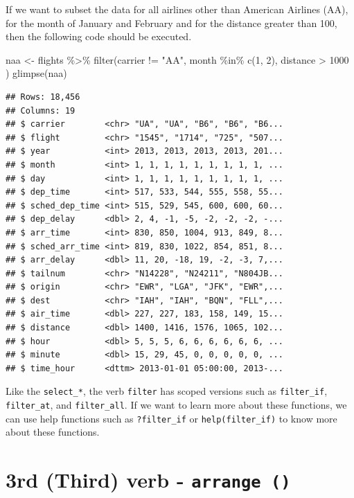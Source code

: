 \documentclass[
]{book}
\newenvironment{Shaded}{\begin{snugshade}}{\end{snugshade}}
\newcommand{\DecValTok}[1]{\textcolor[rgb]{0.00,0.00,0.81}{#1}}
\newcommand{\FunctionTok}[1]{\textcolor[rgb]{0.00,0.00,0.00}{#1}}
\newcommand{\NormalTok}[1]{#1}
\newcommand{\OtherTok}[1]{\textcolor[rgb]{0.56,0.35,0.01}{#1}}
\newcommand{\SpecialCharTok}[1]{\textcolor[rgb]{0.00,0.00,0.00}{#1}}
\newcommand{\StringTok}[1]{\textcolor[rgb]{0.31,0.60,0.02}{#1}}
\begin{document}
If we want to subset the data for all airlines other than American Airlines (AA), for the month of January and February and for the distance greater than 100, then the following code should be executed.

\begin{Shaded}
\begin{Highlighting}[]
\NormalTok{naa }\OtherTok{\textless{}{-}}\NormalTok{ flights }\SpecialCharTok{\%\textgreater{}\%} 
  \FunctionTok{filter}\NormalTok{(carrier }\SpecialCharTok{!=} \StringTok{"AA"}\NormalTok{, month }\SpecialCharTok{\%in\%} \FunctionTok{c}\NormalTok{(}\DecValTok{1}\NormalTok{, }\DecValTok{2}\NormalTok{), distance }\SpecialCharTok{\textgreater{}} \DecValTok{1000}
\NormalTok{  )}
\FunctionTok{glimpse}\NormalTok{(naa)}
\end{Highlighting}
\end{Shaded}

\begin{verbatim}
## Rows: 18,456
## Columns: 19
## $ carrier        <chr> "UA", "UA", "B6", "B6", "B6...
## $ flight         <chr> "1545", "1714", "725", "507...
## $ year           <int> 2013, 2013, 2013, 2013, 201...
## $ month          <int> 1, 1, 1, 1, 1, 1, 1, 1, 1, ...
## $ day            <int> 1, 1, 1, 1, 1, 1, 1, 1, 1, ...
## $ dep_time       <int> 517, 533, 544, 555, 558, 55...
## $ sched_dep_time <int> 515, 529, 545, 600, 600, 60...
## $ dep_delay      <dbl> 2, 4, -1, -5, -2, -2, -2, -...
## $ arr_time       <int> 830, 850, 1004, 913, 849, 8...
## $ sched_arr_time <int> 819, 830, 1022, 854, 851, 8...
## $ arr_delay      <dbl> 11, 20, -18, 19, -2, -3, 7,...
## $ tailnum        <chr> "N14228", "N24211", "N804JB...
## $ origin         <chr> "EWR", "LGA", "JFK", "EWR",...
## $ dest           <chr> "IAH", "IAH", "BQN", "FLL",...
## $ air_time       <dbl> 227, 227, 183, 158, 149, 15...
## $ distance       <dbl> 1400, 1416, 1576, 1065, 102...
## $ hour           <dbl> 5, 5, 5, 6, 6, 6, 6, 6, 6, ...
## $ minute         <dbl> 15, 29, 45, 0, 0, 0, 0, 0, ...
## $ time_hour      <dttm> 2013-01-01 05:00:00, 2013-...
\end{verbatim}

Like the \texttt{select\_*}, the verb \texttt{filter} has scoped versions such as \texttt{filter\_if}, \texttt{filter\_at}, and \texttt{filter\_all}. If we want to learn more about these functions, we can use help functions such as \texttt{?filter\_if} or \texttt{help(filter\_if)} to know more about these functions.

\hypertarget{rd-third-verb---arrange}{%
\section{\texorpdfstring{3rd (Third) verb - \texttt{arrange\ ()}}{3rd (Third) verb - arrange ()}}\label{rd-third-verb---arrange}}
\end{document}
